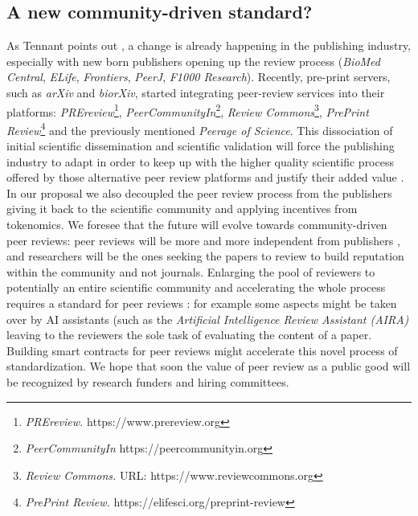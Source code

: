 \documentclass[runningheads]{llncs}
\begin{document}
\subsection{A new community-driven standard?}
As Tennant points out \cite{Tennant2017-F1000R}, a change is already happening in the publishing industry, especially with new born publishers opening up the review process (\emph{BioMed Central}, \emph{ELife}, \emph{Frontiers}, \emph{PeerJ}, \emph{F1000 Research}). Recently, pre-print servers, such as \emph{arXiv} and \emph{biorXiv}, started integrating peer-review services into their platforms: \emph{PREreview}\footnote[19]{\emph{PREreview.} https://www.prereview.org}, \emph{PeerCommunityIn}\footnote[20]{\emph{PeerCommunityIn} https://peercommunityin.org}, \emph{Review Commons}\footnote[21]{\emph{Review Commons.} \textsc{URL:} https://www.reviewcommons.org}, \emph{PrePrint Review}\footnote[22]{\emph{PrePrint Review.} https://elifesci.org/preprint-review} and the previously mentioned \emph{Peerage of Science}. This dissociation of initial scientific dissemination and scientific validation will force the publishing industry to adapt in order to keep up with the higher quality scientific process offered by those alternative peer review platforms and justify their added value \cite{Tennant2017-F1000R}. In our proposal we also decoupled the peer review process from the publishers giving it back to the scientific community and applying incentives from tokenomics. We foresee that the future will evolve towards community-driven peer reviews: peer reviews will be more and more independent from publishers \cite{DecoupJ}, and researchers will be the ones seeking the papers to review to build reputation within the community and not journals.
\newline Enlarging the pool of reviewers to potentially an entire scientific community and accelerating the whole process requires a standard for peer reviews \cite{UPR}: for example some aspects might be taken over by AI assistants (such as the \emph{Artificial Intelligence Review Assistant (AIRA)} \cite{AIRA} leaving to the reviewers the sole task of evaluating the content of a paper. Building smart contracts for peer reviews might accelerate this novel process of standardization. We hope that soon the value of peer review as a public good will be recognized by research funders and hiring committees.
\end{document}
